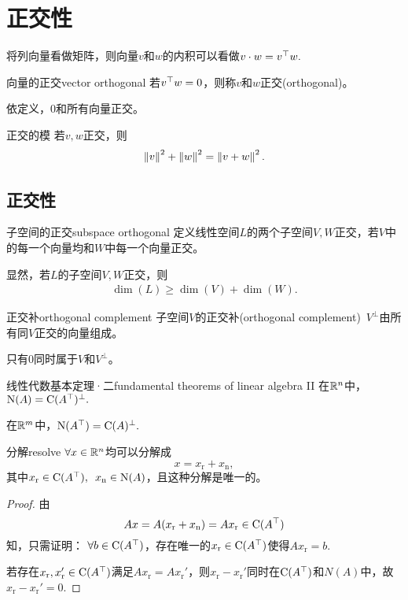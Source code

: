 \chapter{正交性}
将列向量看做矩阵，则向量$v$和$w$的内积可以看做$v\cdot w = v^\top w.$
\begin{definition}{向量的正交}{vector orthogonal}
	若$v^\top w=0$，则称$v$和$w$正交(orthogonal)。
\end{definition}
依定义，0和所有向量正交。
\begin{theorem}{正交的模}{}
	若$v,w$正交，则
	\begin{align}
		\left\lVert v\right\rVert^2+\left\lVert w\right\rVert^2=\left\lVert v+w\right\rVert^2.
	\end{align}
\end{theorem}
\section{正交性}
\begin{definition}{子空间的正交}{subspace orthogonal}
	定义线性空间$L$的两个子空间$V,W$正交，若$V$中的每一个向量均和$W$中每一个向量正交。
\end{definition}
显然，若$L$的子空间$V,W$正交，则
\begin{align}
	\dim(L)\geqslant\dim(V)+\dim(W).
\end{align}
\begin{definition}{正交补}{orthogonal complement}
	子空间$V$的正交补(orthogonal complement)~$V^\perp$由所有同$V$正交的向量组成。
\end{definition}
只有0同时属于$V$和$V^\perp$。
\begin{theorem}{线性代数基本定理·二}{fundamental theorems of linear algebra II}
	在$\mathbb R^n$中，$\operatorname{N}(A)=\operatorname{C}(A^\top)^\perp.$

	在$\mathbb R^m$中，$\operatorname{N}(A^\top)=\operatorname{C}(A)^\perp.$
\end{theorem}
\begin{theorem}{分解}{resolve}
$\forall x\in\mathbb R^n$均可以分解成
\[
	x=x_\mathrm r+x_\mathrm n,
\]
其中$x_\mathrm r\in\operatorname{C}(A^\top),\enspace x_\mathrm n\in\operatorname{N}(A)$，且这种分解是唯一的。
\end{theorem}
\begin{proof}
	由
	\[
		Ax=A(x_\mathrm r+x_\mathrm n)=Ax_\mathrm r\in\operatorname{C}(A^\top)
	\]
	知，只需证明：
	$\forall b\in\operatorname{C}(A^\top)$，存在唯一的$x_\mathrm r\in\operatorname{C}(A^\top)$使得$Ax_\mathrm r=b.$
	
	若存在$x_\mathrm r,x_\mathrm r'\in\operatorname{C}(A^\top)$满足$Ax_\mathrm r=Ax_\mathrm r'$，则$x_\mathrm r-x_\mathrm r'$同时在$\operatorname{C}(A^\top)$和$N(A)$中，故$x_\mathrm r-x_\mathrm r'=0.$
\end{proof}
